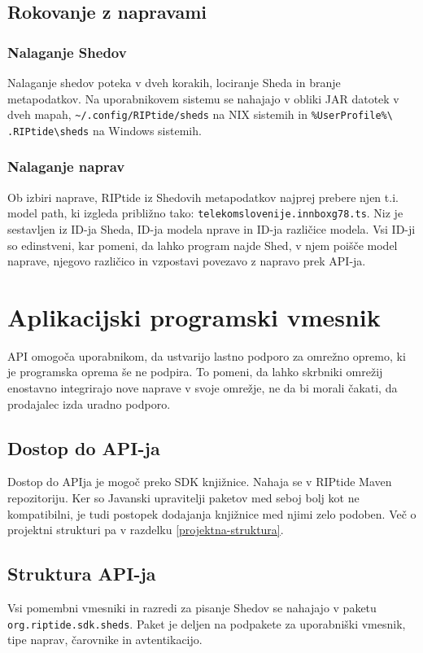 \documentclass[12pt]{article}
\begin{document}
\subsection{Rokovanje z napravami}
\subsubsection{Nalaganje Shedov}
Nalaganje shedov poteka v dveh korakih, lociranje Sheda in branje
metapodatkov. Na uporabnikovem sistemu se nahajajo v obliki JAR datotek v
dveh mapah, \texttt{\textasciitilde/.config/RIPtide/sheds} na NIX sistemih
in \texttt{\%UserProfile\%\textbackslash\\.RIPtide\textbackslash sheds} na
Windows sistemih.

\subsubsection{Nalaganje naprav} \label{nalaganje-naprav}
Ob izbiri naprave, RIPtide iz Shedovih metapodatkov najprej prebere
njen t.i. model path, ki izgleda približno
tako: \texttt{telekomslovenije.innboxg78.ts}. Niz je sestavljen iz ID-ja
Sheda, ID-ja modela nprave in ID-ja različice modela. Vsi ID-ji so
edinstveni, kar pomeni, da lahko program najde Shed, v njem poišče model
naprave, njegovo različico in vzpostavi povezavo z napravo prek API-ja.
\newpage

\section{Aplikacijski programski vmesnik}
API omogoča uporabnikom, da ustvarijo lastno podporo za omrežno
opremo, ki je programska oprema še ne podpira. To pomeni, da lahko
skrbniki omrežij enostavno integrirajo nove naprave v svoje omrežje, ne da
bi morali čakati, da prodajalec izda uradno podporo.

\subsection{Dostop do API-ja}
Dostop do APIja je mogoč preko SDK knjižnice. Nahaja se v RIPtide
Maven repozitoriju. Ker so Javanski upravitelji paketov med seboj bolj
kot ne kompatibilni, je tudi postopek dodajanja knjižnice med njimi
zelo podoben. Več o projektni strukturi pa v razdelku
\ref{projektna-struktura}.

\subsection{Struktura API-ja}
Vsi pomembni vmesniki in razredi za pisanje Shedov se nahajajo v
paketu \texttt{org\-.riptide.sdk.sheds}. Paket je deljen na podpakete za
uporabniški vmesnik, tipe naprav, čarovnike in avtentikacijo.
\end{document}
